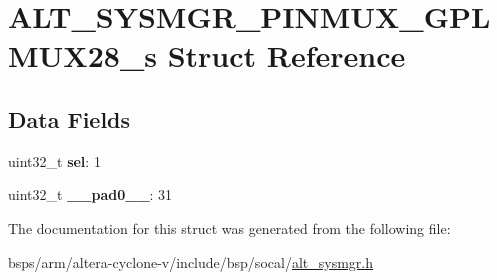 \hypertarget{structALT__SYSMGR__PINMUX__GPLMUX28__s}{}\section{A\+L\+T\+\_\+\+S\+Y\+S\+M\+G\+R\+\_\+\+P\+I\+N\+M\+U\+X\+\_\+\+G\+P\+L\+M\+U\+X28\+\_\+s Struct Reference}
\label{structALT__SYSMGR__PINMUX__GPLMUX28__s}
\subsection*{Data Fields}
\begin{DoxyCompactItemize}
\item 
\mbox{\label{structALT__SYSMGR__PINMUX__GPLMUX28__s_aa10b979766721d28991a87e23a74384c}} 
uint32\+\_\+t {\bfseries sel}\+: 1
\item 
\mbox{\label{structALT__SYSMGR__PINMUX__GPLMUX28__s_af52834007f7ab54c9d18b797d19f857a}} 
uint32\+\_\+t {\bfseries \+\_\+\+\_\+pad0\+\_\+\+\_\+}\+: 31
\end{DoxyCompactItemize}


The documentation for this struct was generated from the following file\+:\begin{DoxyCompactItemize}
\item 
bsps/arm/altera-\/cyclone-\/v/include/bsp/socal/\mbox{\hyperlink{alt__sysmgr_8h}{alt\+\_\+sysmgr.\+h}}\end{DoxyCompactItemize}
